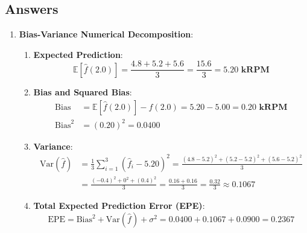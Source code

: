 \subsection*{Answers}\label{subsec:model_quality_answers}

\begin{enumerate}
    \item \textbf{Bias-Variance Numerical Decomposition}:
    \begin{enumerate}[label=(\alph*)]
        \item \textbf{Expected Prediction}:
        \begin{equation*}
        \mathbb{E}[\hat{f}(2.0)] = \frac{4.8 + 5.2 + 5.6}{3} = \frac{15.6}{3} = \mathbf{5.20\text{ kRPM}}
        \end{equation*}

        \item \textbf{Bias and Squared Bias}:
        \begin{align*}
        \text{Bias} &= \mathbb{E}[\hat{f}(2.0)] - f(2.0) = 5.20 - 5.00 = \mathbf{0.20\text{ kRPM}} \\
        \text{Bias}^2 &= (0.20)^2 = \mathbf{0.0400}
        \end{align*}

        \item \textbf{Variance}:
        \begin{align*}
        \text{Var}(\hat{f}) &= \frac{1}{3} \sum_{i=1}^3 (\hat{f}_i - 5.20)^2 = \frac{(4.8 - 5.2)^2 + (5.2 - 5.2)^2 + (5.6 - 5.2)^2}{3} \\
        &= \frac{(-0.4)^2 + 0^2 + (0.4)^2}{3} = \frac{0.16 + 0.16}{3} = \frac{0.32}{3} \approx \mathbf{0.1067}
        \end{align*}

        \item \textbf{Total Expected Prediction Error (EPE)}:
        \begin{equation*}
        \text{EPE} = \text{Bias}^2 + \text{Var}(\hat{f}) + \sigma^2 = 0.0400 + 0.1067 + 0.0900 = \mathbf{0.2367}
        \end{equation*}
    \end{enumerate}


\end{enumerate}
